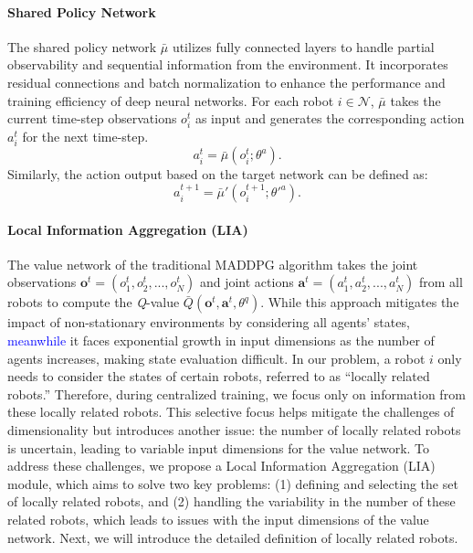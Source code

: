 \documentclass[lettersize,journal]{IEEEtran}
\newcommand{\blue}[1]{\textcolor{blue}{#1}}
\begin{document}
\paragraph{\textbf{Shared Policy Network}}
The shared policy network $\bar{\mu}$ utilizes fully connected layers to handle partial observability and sequential information from the environment. It incorporates residual connections \cite{he2016deep} and batch normalization \cite{ioffe2015batch} to enhance the performance and training efficiency of deep neural networks. For  each robot $i\in \mathcal{N}$, $\bar{\mu}$ takes the current time-step observations $o_i^t$ as input and generates the corresponding action $a_i^t$ for the next time-step.
\begin{equation}
    a_{i}^{t}=\bar{\mu}(o_{i}^{t};\theta^{a}).\label{eq10}
\end{equation}
Similarly, the action output based on the target network can be defined as:
\begin{equation}
    a_i^{t+1}=\bar{\mu}'(o_i^{t+1};\theta'^{a}).\label{eq11}
\end{equation}

\paragraph{\textbf{Local Information Aggregation (LIA)}}
The value network of the traditional MADDPG algorithm takes the joint observations $\boldsymbol{o}^t = (o_1^t, o_2^t, ..., o_N^t)$ and joint actions $\boldsymbol{a}^t = (a_1^t, a_2^t, ..., a_N^t)$ from all robots to compute the \textit{Q}-value $\bar{Q}(\boldsymbol{o}^t, \boldsymbol{a}^t, \theta^{q})$. While this approach mitigates the impact of non-stationary environments by considering all agents' states, \blue{meanwhile} it faces exponential growth in input dimensions as the number of agents increases, making state evaluation difficult. In our problem, a robot $i$ only needs to consider the states of certain robots, referred to as “locally related robots.” Therefore, during centralized training, we focus only on information from these locally related robots. This selective focus helps mitigate the challenges of dimensionality but introduces another issue: the number of locally related robots is uncertain, leading to variable input dimensions for the value network. To address these challenges, we propose a Local Information Aggregation (LIA) module, which aims to solve two key problems: (1) defining and selecting the set of locally related robots, and (2) handling the variability in the number of these related robots, which leads to issues with the input dimensions of the value network. Next, we will introduce the detailed definition of locally related robots.
\end{document}
